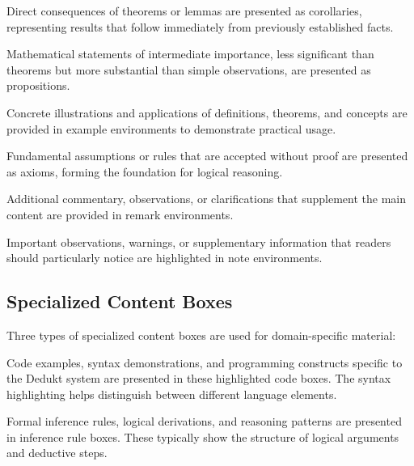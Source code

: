 \begin{corollary}
    Direct consequences of theorems or lemmas are presented as corollaries, representing results that follow immediately from previously established facts.
\end{corollary}

\begin{proposition}
    Mathematical statements of intermediate importance, less significant than theorems but more substantial than simple observations, are presented as propositions.
\end{proposition}

\begin{example}
    Concrete illustrations and applications of definitions, theorems, and concepts are provided in example environments to demonstrate practical usage.
\end{example}

\begin{axiom}
    Fundamental assumptions or rules that are accepted without proof are presented as axioms, forming the foundation for logical reasoning.
\end{axiom}

\begin{remark}
    Additional commentary, observations, or clarifications that supplement the main content are provided in remark environments.
\end{remark}

\begin{note}
    Important observations, warnings, or supplementary information that readers should particularly notice are highlighted in note environments.
\end{note}

\subsection*{Specialized Content Boxes}\label{subsec:specialized-content-boxes}

Three types of specialized content boxes are used for domain-specific material:

\begin{deduktcode}
    Code examples, syntax demonstrations, and programming constructs specific to the Dedukt system are presented in these highlighted code boxes. The syntax highlighting helps distinguish between different language elements.
\end{deduktcode}

\begin{inferenceBox}
    Formal inference rules, logical derivations, and reasoning patterns are presented in inference rule boxes.
    These typically show the structure of logical arguments and deductive steps.
\end{inferenceBox}


